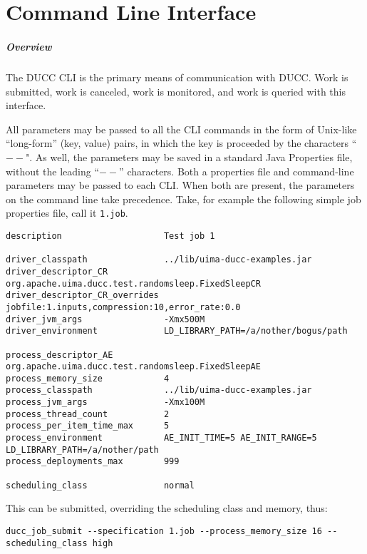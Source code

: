 \ifpdf
\else
{}
\fi
\chapter{Command Line Interface}
\label{chap:cli}

    \paragraph{Overview}
    The DUCC CLI is the primary means of communication with DUCC.  Work is submitted, work is
    canceled, work is monitored, and work is queried with this interface.

    All parameters may be passed to all the CLI commands in the form of Unix-like ``long-form''
    (key, value) pairs, in which the key is proceeded by the characters ``$--$".  As well, the
    parameters may be saved in a standard Java Properties file, without the leading ``$--$''
    characters.  Both a properties file and command-line parameters may be passed to each CLI.  When
    both are present, the parameters on the command line take precedence.  Take, for example
    the following simple job properties file, call it {\tt 1.job}.
\begin{verbatim}
description                    Test job 1

driver_classpath               ../lib/uima-ducc-examples.jar
driver_descriptor_CR           org.apache.uima.ducc.test.randomsleep.FixedSleepCR
driver_descriptor_CR_overrides jobfile:1.inputs,compression:10,error_rate:0.0
driver_jvm_args                -Xmx500M
driver_environment             LD_LIBRARY_PATH=/a/nother/bogus/path

process_descriptor_AE          org.apache.uima.ducc.test.randomsleep.FixedSleepAE
process_memory_size            4
process_classpath              ../lib/uima-ducc-examples.jar
process_jvm_args               -Xmx100M 
process_thread_count           2
process_per_item_time_max      5
process_environment            AE_INIT_TIME=5 AE_INIT_RANGE=5 LD_LIBRARY_PATH=/a/nother/path
process_deployments_max        999

scheduling_class               normal
\end{verbatim}

    This can be submitted, overriding the scheduling class and memory, thus:
\begin{verbatim}
ducc_job_submit --specification 1.job --process_memory_size 16 --scheduling_class high
\end{verbatim}    

